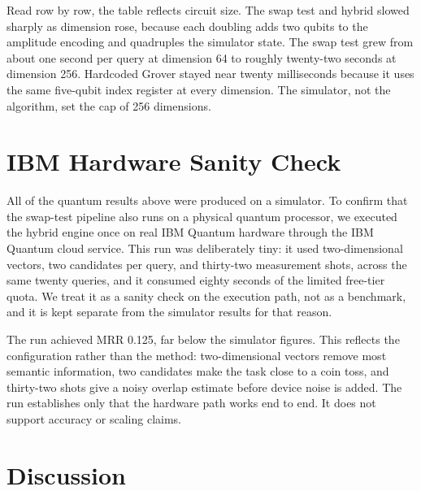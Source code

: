Read row by row, the table reflects circuit size. The swap test and hybrid
slowed sharply as dimension rose, because each doubling adds two qubits to the
amplitude encoding and quadruples the simulator state. The swap test grew from
about one second per query at dimension 64 to roughly twenty-two seconds at
dimension 256. Hardcoded Grover stayed near twenty milliseconds because it uses
the same five-qubit index register at every dimension. The simulator, not the
algorithm, set the cap of 256 dimensions.

\section{IBM Hardware Sanity Check}
\label{sec:results:ibm}


All of the quantum results above were produced on a simulator. To confirm that
the swap-test pipeline also runs on a physical quantum processor, we executed the
hybrid engine once on real IBM Quantum hardware through the IBM Quantum cloud
service. This run was deliberately tiny: it used two-dimensional vectors, two
candidates per query, and thirty-two measurement shots, across the same twenty
queries, and it consumed eighty seconds of the limited free-tier quota. We treat
it as a sanity check on the execution path, not as a benchmark, and it is kept
separate from the simulator results for that reason.

The run achieved MRR 0.125, far below the simulator figures. This reflects the
configuration rather than the method: two-dimensional vectors remove most
semantic information, two candidates make the task close to a coin toss, and
thirty-two shots give a noisy overlap estimate before device noise is added. The
run establishes only that the hardware path works end to end. It does not
support accuracy or scaling claims.

\section{Discussion}
\label{sec:results:discussion}



